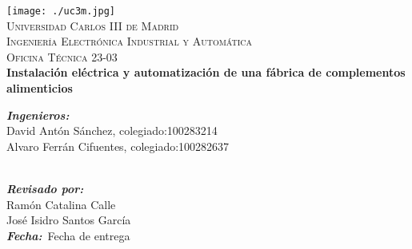 \begin{titlepage}

\begin{center}


\texttt{[image: ./uc3m.jpg]}\\[2cm]    
\textsc{\huge Universidad Carlos III de Madrid}\\[0.5cm]
\textsc{\LARGE Ingeniería Electrónica Industrial y Automática}\\[0.5cm]
\textsc{\Large Oficina Técnica 23-03}\\[4cm]

{\LARGE \bfseries{Instalación eléctrica y automatización de una fábrica de complementos alimenticios}\\[4.5cm]}


\end{center}
\setlength{\parindent}{0cm}


\vspace{10pt}
\emph{\bfseries{Ingenieros:}}\\
David Antón Sánchez, colegiado:100283214\\
Alvaro Ferrán Cifuentes, colegiado:100282637\\\




\emph{\bfseries{Revisado por:}}\\
Ramón Catalina Calle\\
José Isidro Santos García\\


\emph{\bfseries{Fecha:}}\ Fecha de entrega\\












\end{titlepage}